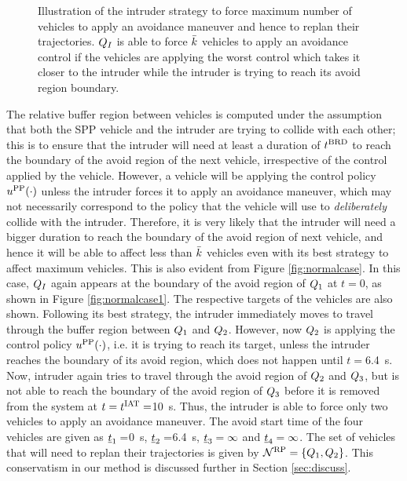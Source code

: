 \begin{figure}[H]
\begin{subfigure}{.5\columnwidth}
  \subcaption{}
  \label{fig:worstcase4}
\end{subfigure}
\caption{Illustration of the intruder strategy to force maximum number of vehicles to apply an avoidance maneuver and hence to replan their trajectories. $Q_{I}$ is able to force $\bar{k}$ vehicles to apply an avoidance control if the vehicles are applying the worst control which takes it closer to the intruder while the intruder is trying to reach its avoid region boundary. }
\label{fig:worstcase}
\end{figure}

The relative buffer region between vehicles is computed under the assumption that both the SPP vehicle and the intruder are trying to collide with each other; this is to ensure that the intruder will need at least a duration of $t^\text{BRD}$ to reach the boundary of the avoid region of the next vehicle, irrespective of the control applied by the vehicle. However, a vehicle will be applying the control policy $u^{\text{PP}}(\cdot)$ unless the intruder forces it to apply an avoidance maneuver, which may not necessarily correspond to the policy that the vehicle will use to \textit{deliberately} collide with the intruder. Therefore, it is very likely that the intruder will need a bigger duration to reach the boundary of the avoid region of next vehicle, and hence it will be able to affect less than $\bar{k}$ vehicles even with its best strategy to affect maximum vehicles. This is also evident from Figure \ref{fig:normalcase}. In this case, $Q_{I}$ again appears at the boundary of the avoid region of $Q_1$ at $t=0$, as shown in Figure \ref{fig:normalcase1}. The respective targets of the vehicles are also shown. Following its best strategy, the intruder immediately moves to travel through the buffer region between $Q_1$ and $Q_2$. However, now $Q_2$ is applying the control policy $u^{\text{PP}}(\cdot)$, i.e. it is trying to reach its target, unless the intruder reaches the boundary of its avoid region, which does not happen until $t= $\SI{6.4}{\s}. Now, intruder again tries to travel through the avoid region of $Q_2$ and $Q_3$, but is not able to reach the boundary of the avoid region of $Q_3$ before it is removed from the system at $t=t^\text{IAT}=$\SI{10}{\s}. Thus, the intruder is able to force only two vehicles to apply an avoidance maneuver. The avoid start time of the four vehicles are given as $\underline{t}_1 = $\SI{0}{\s}, $\underline{t}_2 = $\SI{6.4}{\s}, $\underline{t}_3 = \infty$ and $\underline{t}_4 = \infty$. The set of vehicles that will need to replan their trajectories is given by $\mathcal{N}^\text{RP} = \{Q_1, Q_2\}$. This conservatism in our method is discussed further in Section \ref{sec:discuss}.
